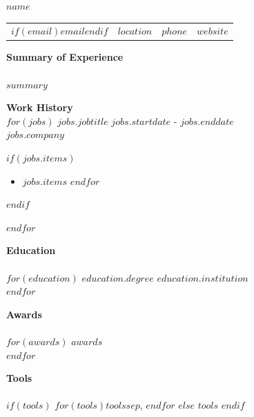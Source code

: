 \documentclass{article}
\begin{document}
\begin{center}
\textbf{\LARGE $name$} \\
\vspace*{\baselineskip}
\begin{tabular}{c@{\hskip 0.5in}c@{\hskip 0.5in}c@{\hskip 0.5in}c}
$if(email)$\href{mailto:$email$}{$email$}$endif$ & $location$ & $phone$ & \href{$website$}{$website$} \\
\end{tabular}
\end{center} 

\noindent\textbf{Summary of Experience} \\\\
$summary$
\vspace*{\baselineskip}

\noindent\textbf{Work History} \\
$for(jobs)$
\textbf{$jobs.jobtitle$} \hfill $jobs.startdate$ - $jobs.enddate$ \\
$jobs.company$

$if(jobs.items)$
\begin{itemize}[noitemsep]
    $for(jobs.items)$
    \item $jobs.items$
    $endfor$
\end{itemize}
$endif$

\vspace{0.5em}
$endfor$

\noindent\textbf{Education} \\\\
$for(education)$
\textbf{$education.degree$} \hfill $education.institution$ \\
$endfor$
\vspace{0.5em}

\noindent\textbf{Awards} \\\\
$for(awards)$
\textbf{$awards$} \\
$endfor$
\vspace{0.5em}

\noindent\textbf{Tools} \\\\
$if(tools)$
  $for(tools)$$tools$$sep$, $endfor$
$else$
  $tools$
$endif$
\vspace{0.5em}
\end{document}
